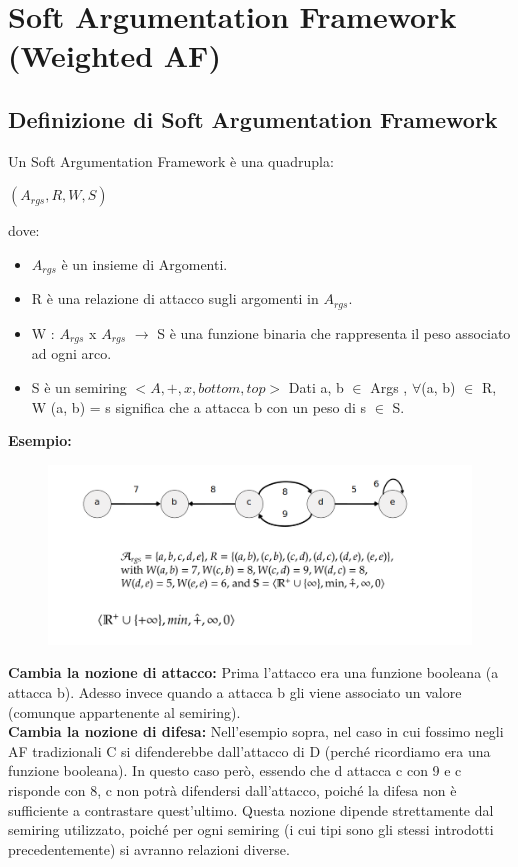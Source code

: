 \chapter{Soft Argumentation Framework (Weighted AF)}
\section{Definizione di Soft Argumentation Framework}
Un Soft Argumentation Framework è una quadrupla:
\begin{center}
    $(A_{rgs} , R, W, S)$
\end{center}
dove:
\begin{itemize}
    \item $A_{rgs}$ è un insieme di Argomenti.
    \item R è una relazione di attacco sugli argomenti in $A_{rgs}$.
    \item W : $A_{rgs}$ x $A_{rgs}$ $\rightarrow$ S è una funzione binaria che
          rappresenta il peso associato ad ogni arco.
    \item S è un semiring $< A, +, x, bottom, top >$ Dati a, b $\in$ Args ,
          $\forall$(a, b) $\in$ R, W (a, b) = s significa che a attacca b con un peso
          di s $\in$ S.
\end{itemize}

\textbf{ Esempio:}
\begin{figure}[H]
    \centering
    \includegraphics[width=14cm, keepaspectratio]{img/Cap6/SoftA2.png}
\end{figure}

\textbf{Cambia la nozione di attacco:} Prima l'attacco era una funzione
booleana (a attacca b). Adesso invece quando a attacca b gli viene associato un
valore (comunque appartenente al semiring). \\\textbf{Cambia la nozione di
    difesa:} Nell'esempio sopra, nel caso in cui fossimo negli AF tradizionali C si
difenderebbe dall'attacco di D (perché ricordiamo era una funzione booleana). In
questo caso però, essendo che d attacca c con 9 e c risponde con 8, c non potrà
difendersi dall'attacco, poiché la difesa non è sufficiente a contrastare
quest'ultimo. Questa nozione dipende strettamente dal semiring utilizzato,
poiché per ogni semiring (i cui tipi sono gli stessi introdotti precedentemente)
si avranno relazioni diverse.
